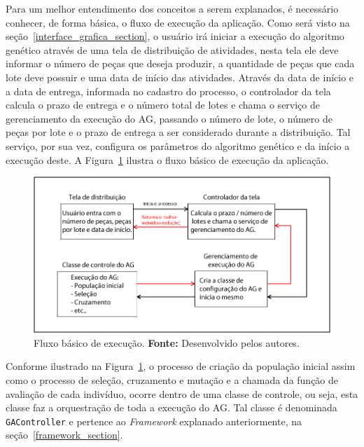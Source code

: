 \par Para um melhor entendimento dos conceitos a serem explanados, é necessário
conhecer, de forma básica, o fluxo de execução da aplicação. Como será visto na seção~\ref{interface_grafica_section}, o usuário irá iniciar a execução do algoritmo genético através de uma tela de distribuição de atividades, nesta tela ele deve informar o número de peças que deseja produzir, a quantidade de peças que cada lote deve possuir e uma data de início das atividades. Através da data de início e a data de entrega, informada no cadastro do processo, o controlador da tela calcula o prazo de entrega e o número total de lotes e chama o serviço de gerenciamento da execução do AG, passando o número de lote, o número de peças por lote e o prazo de entrega a ser considerado durante a distribuição. Tal serviço, por sua vez, configura os parâmetros do algoritmo genético e da início a execução deste. A Figura~\ref{fig:fluxo_basico} ilustra o fluxo básico de execução da aplicação.

\begin{figure}[h!]
	\centerline{\includegraphics[scale=0.5]{./imagens/fluxo_basico.png}}
	\caption[Fluxo básico de execução.]
	{Fluxo básico de execução. \textbf{Fonte:} Desenvolvido pelos autores.}
	\label{fig:fluxo_basico}
\end{figure}

\par Conforme ilustrado na Figura~\ref{fig:fluxo_basico}, o processo de criação da população inicial assim como o processo de seleção, 
cruzamento e mutação e a chamada da função de avaliação de cada indivíduo, ocorre dentro de uma classe de controle,
ou seja, esta classe faz a orquestração de toda a execução do AG. Tal classe é denominada \texttt{GAController} e
pertence ao \textit{Framework} explanado anteriormente, na seção~\ref{framework_section}.

